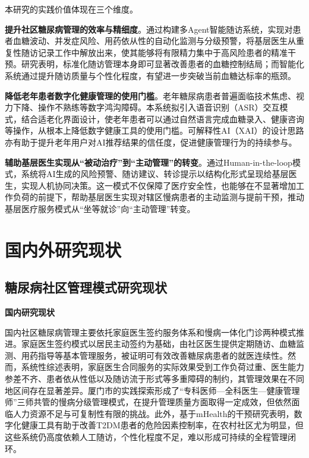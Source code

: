 本研究的实践价值体现在三个维度。

\textbf{提升社区糖尿病管理的效率与精细度}。通过构建多Agent智能随访系统，实现对患者血糖波动、并发症风险、用药依从性的自动化监测与分级预警，将基层医生从重复性随访记录工作中解放出来，使其能够将有限精力集中于高风险患者的精准干预。研究表明，标准化随访管理本身即可显著改善患者的血糖控制结局；而智能化系统通过提升随访质量与个性化程度，有望进一步突破当前血糖达标率的瓶颈\todocite{}。

\textbf{降低老年患者数字化健康管理的使用门槛}。老年糖尿病患者普遍面临技术焦虑、视力下降、操作不熟练等数字鸿沟障碍。本系统拟引入语音识别（ASR）交互模式，结合适老化界面设计，使老年患者可以通过自然语言完成血糖录入、健康咨询等操作，从根本上降低数字健康工具的使用门槛。可解释性AI（XAI）的设计思路亦有助于提升老年用户对AI推荐结果的信任度，促进健康管理行为的持续参与\todocite{}\todocite{}\todocite{}。

\textbf{辅助基层医生实现从``被动治疗''到``主动管理''的转变}。通过Human-in-the-loop模式，系统将AI生成的风险预警、随访建议、转诊提示以结构化形式呈现给基层医生，实现人机协同决策。这一模式不仅保障了医疗安全性，也能够在不显著增加工作负荷的前提下，帮助基层医生实现对辖区慢病患者的主动监测与提前干预，推动基层医疗服务模式从``坐等就诊''向``主动管理''转变\todocite{}\todocite{}。


\section{国内外研究现状}

\subsection{糖尿病社区管理模式研究现状}

\noindent\textbf{国内研究现状}

国内社区糖尿病管理主要依托家庭医生签约服务体系和慢病一体化门诊两种模式推进。家庭医生签约模式以居民主动签约为基础，由社区医生提供定期随访、血糖监测、用药指导等基本管理服务，被证明可有效改善糖尿病患者的就医连续性。然而，系统性综述表明，家庭医生合同服务的实际效果受到工作负荷过重、医生能力参差不齐、患者依从性低以及随访流于形式等多重障碍的制约，其管理效果在不同地区间存在显著差异。厦门市的实践探索形成了``专科医师---全科医生---健康管理师''三师共管的慢病分级管理模式，在提升管理质量方面取得一定成效，但依然面临人力资源不足与可复制性有限的挑战。此外，基于mHealth的干预研究表明，数字化健康工具有助于改善T2DM患者的危险因素控制率，在农村社区尤为明显，但这些系统仍高度依赖人工随访，个性化程度不足，难以形成可持续的全程管理闭环\todocite{}\todocite{}\todocite{}\todocite{}\todocite{}。

